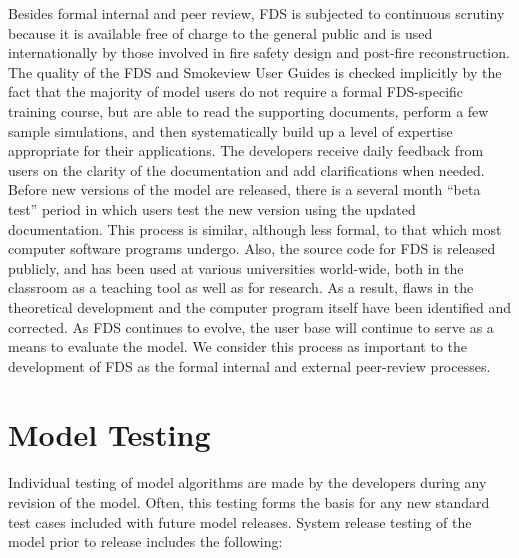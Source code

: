 \documentclass[11pt]{book}
\begin{document}
Besides formal internal and peer review, FDS is subjected to continuous scrutiny because it is available free of charge to the general public and is used internationally by those involved in fire safety design and post-fire reconstruction. The quality of the FDS and Smokeview User Guides is checked implicitly by the fact that the majority of model users do not require a formal FDS-specific training course, but are able to read the supporting documents, perform a few sample simulations, and then systematically build up a level of expertise appropriate for their applications. The developers receive daily feedback from users on the clarity of the documentation and add clarifications when needed. Before new versions of the model are released, there is a several month ``beta test'' period in which users test the new version using the updated documentation. This process is similar, although less formal, to that which most computer software programs undergo. Also, the source code for FDS is released publicly, and has been used at various universities world-wide, both in the classroom as a teaching tool as well as for research. As a result, flaws in the theoretical development and the computer program itself have been identified and corrected. As FDS continues to evolve, the user base will continue to serve as a means to evaluate the model. We consider this process as important to the development of FDS as the formal internal and external peer-review processes.

\section{Model Testing}

Individual testing of model algorithms are made by the developers during any revision of the model. Often, this testing forms the basis for any new standard test cases included with future model releases. System release testing of the model prior to release includes the following:
\end{document}
